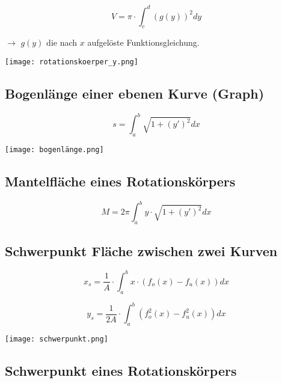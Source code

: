 \begin{multicols*}{3}
    \begin{multicols}{2}

        {$$V = \pi \cdot \int_{c}^{d}(g(y))^2dy$$}

        $\rightarrow$ $g(y)$ die nach $x$ aufgelöste Funktionsgleichung.

        \columnbreak
        \texttt{[image: rotationskoerper\_y.png]}
    \end{multicols}



    \subsection{Bogenlänge einer ebenen Kurve (Graph)}

    \begin{multicols}{2}

        {$$s = \int_{a}^{b}\sqrt{1+(y')^2}dx$$}

        \columnbreak
        \texttt{[image: bogenlänge.png]}


    \end{multicols}

    \subsection{Mantelfläche eines Rotationskörpers}

    {$$M = 2\pi \int_{a}^{b} y \cdot \sqrt{1+(y')^2}dx$$}
    \vfill\null
    \columnbreak
    \subsection{Schwerpunkt Fläche zwischen zwei Kurven}

    \begin{multicols}{2}

        {$$x_s =\frac{1}{A}\cdot \int_{a}^{b}x \cdot(f_o(x)-f_u(x))dx$$}

        {$$y_s =\frac{1}{2A}\cdot \int_{a}^{b}(f_o^2(x)-f_u^2(x))dx$$}

        \columnbreak
        \texttt{[image: schwerpunkt.png]}


    \end{multicols}


    \subsection{Schwerpunkt eines Rotationskörpers}


\end{multicols*}
